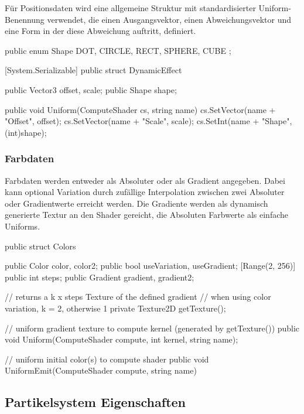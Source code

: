Für Positionsdaten wird eine allgemeine Struktur mit standardisierter Uniform-Benennung verwendet, die einen Ausgangsvektor, einen Abweichungsvektor und eine Form in der diese Abweichung auftritt, definiert.

\begin{csh}
public enum Shape { DOT, CIRCLE, RECT, SPHERE, CUBE };

[System.Serializable]
public struct DynamicEffect
{
    public Vector3 offset, scale;
    public Shape shape;

    public void Uniform(ComputeShader cs, string name)
    {
        cs.SetVector(name + "Offset", offset);
        cs.SetVector(name + "Scale", scale);
        cs.SetInt(name + "Shape", (int)shape);
    }
}
\end{csh}



\subsubsection{Farbdaten}

Farbdaten werden entweder als Absoluter oder als Gradient angegeben. Dabei kann optional Variation durch zufällige Interpolation zwischen zwei Absoluter oder Gradientwerte erreicht werden. Die Gradiente werden als dynamisch generierte Textur an den Shader gereicht, die Absoluten Farbwerte als einfache Uniforms.

\begin{csh}
public struct Colors
{
    public Color color, color2;
    public bool useVariation, useGradient;
    [Range(2, 256)] public int steps;
    public Gradient gradient, gradient2;

    // returns a k x steps Texture of the defined gradient
    // when using color variation, k = 2, otherwise 1
    private Texture2D getTexture();

    // uniform gradient texture to compute kernel (generated by getTexture())
    public void Uniform(ComputeShader compute, int kernel, string name);

    // uniform initial color(s) to compute shader
    public void UniformEmit(ComputeShader compute, string name)
}
\end{csh}



\subsection{Partikelsystem Eigenschaften}

